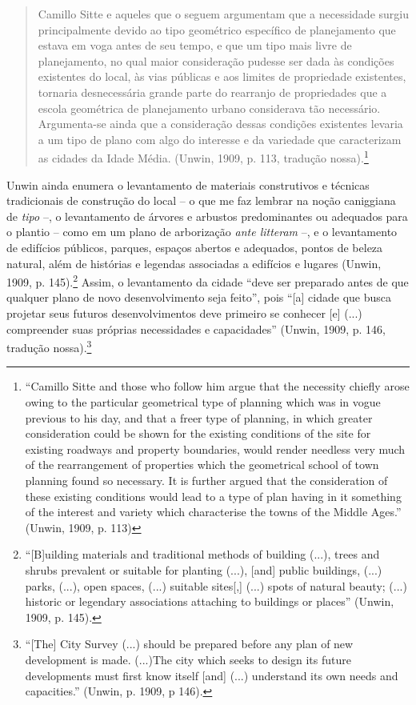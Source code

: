 \documentclass[12pt, a4paper]{book} %
\begin{document}
        \begin{quotation}
            Camillo Sitte e aqueles que o seguem argumentam que a necessidade surgiu principalmente devido ao tipo geométrico específico de planejamento que estava em voga antes de seu tempo, e que um tipo mais livre de planejamento, no qual maior consideração pudesse ser dada às condições existentes do local, às vias públicas e aos limites de propriedade existentes, tornaria desnecessária grande parte do rearranjo de propriedades que a escola geométrica de planejamento urbano considerava tão necessário. Argumenta-se ainda que a consideração dessas condições existentes levaria a um tipo de plano com algo do interesse e da variedade que caracterizam as cidades da Idade Média. (Unwin, 1909, p. 113, tradução nossa).\footnote[26]{``Camillo Sitte and those who follow him argue that the necessity chiefly arose owing to the particular geometrical type of planning which was in vogue previous to his day, and that a freer type of planning, in which greater consideration could be shown for the existing conditions of the site for existing roadways and property boundaries, would render needless very much of the rearrangement of properties which the geometrical school of town planning found so necessary. It is further argued that the consideration of these existing conditions would lead to a type of plan having in it something of the interest and variety which characterise the towns of the Middle Ages.'' (Unwin, 1909, p. 113)}
        \end{quotation}

        Unwin ainda enumera o levantamento de materiais construtivos e técnicas tradicionais de construção do local – o que me faz lembrar na noção caniggiana de \textit{tipo} –, o levantamento de árvores e arbustos predominantes ou adequados para o plantio – como em um plano de arborização \textit{ante litteram} –, e o levantamento de edifícios públicos, parques, espaços abertos e adequados, pontos de beleza natural, além de histórias e legendas associadas a edifícios e lugares (Unwin, 1909, p. 145).\footnote[27]{``[B]uilding materials and traditional methods of building (...), trees and shrubs prevalent or suitable for planting (...), [and] public buildings, (...) parks, (...), open spaces, (...) suitable sites[,] (...) spots of natural beauty; (...) historic or legendary associations attaching to buildings or places'' (Unwin, 1909, p. 145).} Assim, o levantamento da cidade ``deve ser preparado antes de que qualquer plano de novo desenvolvimento seja feito'', pois ``[a] cidade que busca projetar seus futuros desenvolvimentos deve primeiro se conhecer [e] (...) compreender suas próprias necessidades e capacidades'' (Unwin, 1909, p. 146, tradução nossa).\footnote[28]{``[The] City Survey (...) should be prepared before any plan of new development is made. (...)The city which seeks to design its future developments must first know itself [and] (...) understand its own needs and capacities.'' (Unwin, p. 1909, p 146).}
\end{document}
